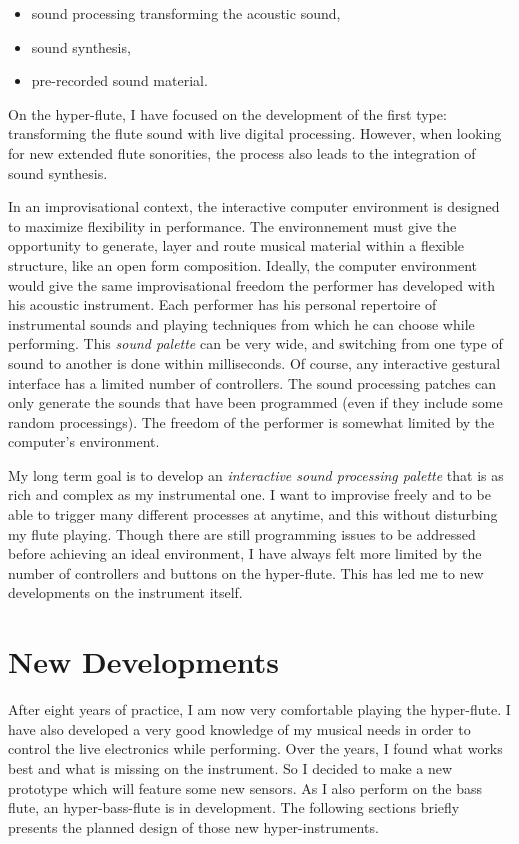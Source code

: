 \begin{itemize}
\item sound processing transforming the acoustic sound,
\item sound synthesis,
\item pre-recorded sound material.
\end{itemize}


On the hyper-flute, I have focused on the development of the first type: transforming the flute sound with live digital processing. However, when looking for new extended flute sonorities, the process also leads to the integration of sound synthesis.

In an improvisational context, the interactive computer environment is designed to maximize flexibility in performance. The environnement must give the opportunity to generate, layer and route musical material within a flexible structure, like an open form composition. Ideally, the computer environment would give the same improvisational freedom the performer has developed with his acoustic instrument. Each performer has his personal repertoire of instrumental sounds and playing techniques from which he can choose while performing. This \emph{sound palette} can be very wide, and switching from one type of sound to another is done within milliseconds. Of course, any interactive gestural interface has a limited number of controllers. The sound processing patches can only generate the sounds that have been programmed (even if they include some random processings). The freedom of the performer is somewhat limited by the computer's environment. 

My long term goal is to develop an \emph{interactive sound processing palette} that is as rich and complex as my instrumental one. I want to improvise freely and to be able to trigger many different processes at anytime, and this without disturbing my flute playing. Though there are still programming issues to be addressed before achieving an ideal environment, I have always felt more limited by the number of controllers and buttons on the hyper-flute. This has led me to new developments on the instrument itself.


\section{New Developments}

After eight years of practice, I am now very comfortable playing the hyper-flute. I have also developed a very good knowledge of my musical needs in order to control the live electronics while performing. Over the years, I found what works best and what is missing on the instrument. So I decided to make a new prototype which will feature some new sensors. As I also perform on the bass flute, an hyper-bass-flute is in development. The following sections briefly presents the planned design of those new hyper-instruments.


